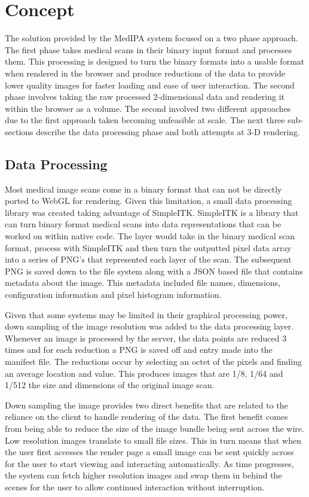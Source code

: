 \documentclass[annual]{acmsiggraph}
\begin{document}
\section{Concept}
	The solution provided by the MedIPA system focused on a two phase approach.  The first phase takes medical scans in their binary input format and processes them.  This processing is designed to turn the binary formats into a usable format when rendered in the browser and produce reductions of the data to provide lower quality images for faster loading and ease of user interaction.  The second phase involves taking the raw processed 2-dimensional data and rendering it within the browser as a volume.  The second involved two different approaches due to the first approach taken becoming unfeasible at scale.  The next three sub-sections describe the data processing phase and both attempts at 3-D rendering.

\subsection{Data Processing}

Most medical image scans come in a binary format that can not be directly ported to WebGL for rendering.  Given this limitation, a small data processing library was created taking advantage of SimpleITK.  SimpleITK is a library that can turn binary format medical scans into data representations that can be worked on within native code.  The layer would take in the binary medical scan format, process with SimpleITK and then turn the outputted pixel data array into a series of PNG's that represented each layer of the scan.  The subsequent PNG is saved down to the file system along with a JSON based file that contains metadata about the image.  This metadata included file names, dimensions, configuration information and pixel histogram information.

Given that some systems may be limited in their graphical processing power, down sampling of the image resolution was added to the data processing layer.  Whenever an image is processed by the server, the data points are reduced 3 times and for each reduction a PNG is saved off and entry made into the manifest file.  The reductions occur by selecting an octet of the pixels and finding an average location and value.  This produces images that are 1/8, 1/64 and 1/512 the size and dimensions of the original image scan.

Down sampling the image provides two direct benefits that are related to the reliance on the client to handle rendering of the data.  The first benefit comes from being able to reduce the size of the image bundle being sent across the wire.  Low resolution images translate to small file sizes.  This in turn means that when the user first accesses the render page a small image can be sent quickly across for the user to start viewing and interacting automatically.  As time progresses, the system can fetch higher resolution images and swap them in behind the scenes for the user to allow continued interaction without interruption.  
\end{document}
